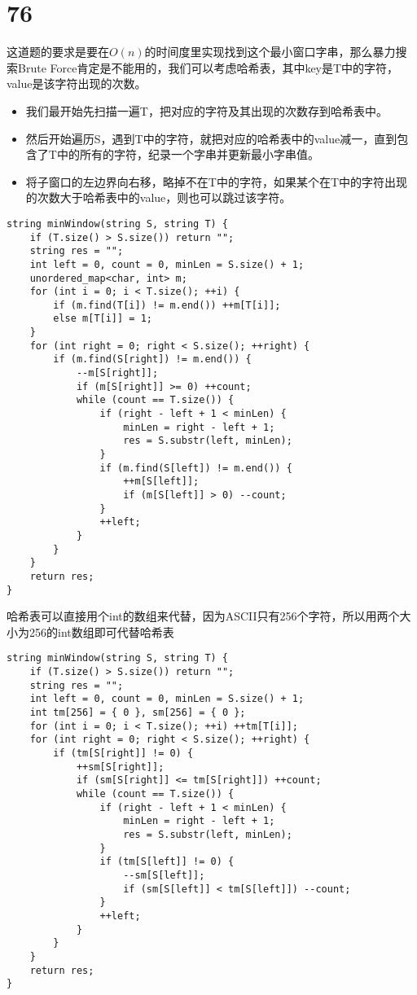 \documentclass[12pt,a4paper]{article}
\begin{document}
\section{76}
\begin{CJK}{UTF8}{gbsn}
这道题的要求是要在$O(n)$的时间度里实现找到这个最小窗口字串，那么暴力搜索Brute Force肯定是不能用的，我们可以考虑哈希表，其中key是T中的字符，value是该字符出现的次数。
\begin{itemize}
\item 我们最开始先扫描一遍T，把对应的字符及其出现的次数存到哈希表中。
\item 然后开始遍历S，遇到T中的字符，就把对应的哈希表中的value减一，直到包含了T中的所有的字符，纪录一个字串并更新最小字串值。
\item 将子窗口的左边界向右移，略掉不在T中的字符，如果某个在T中的字符出现的次数大于哈希表中的value，则也可以跳过该字符。
\end{itemize}
\end{CJK}
\begin{lstlisting}
string minWindow(string S, string T) {
	if (T.size() > S.size()) return "";
	string res = "";
	int left = 0, count = 0, minLen = S.size() + 1;
	unordered_map<char, int> m;
	for (int i = 0; i < T.size(); ++i) {
		if (m.find(T[i]) != m.end()) ++m[T[i]];
		else m[T[i]] = 1;
	}
	for (int right = 0; right < S.size(); ++right) {
		if (m.find(S[right]) != m.end()) {
			--m[S[right]];
			if (m[S[right]] >= 0) ++count;
			while (count == T.size()) {
				if (right - left + 1 < minLen) {
					minLen = right - left + 1;
					res = S.substr(left, minLen);
				}
				if (m.find(S[left]) != m.end()) {
					++m[S[left]];
					if (m[S[left]] > 0) --count;
				}
				++left;
			}
		}
	}
	return res;
}
\end{lstlisting}
\begin{CJK}{UTF8}{gbsn}
哈希表可以直接用个int的数组来代替，因为ASCII只有256个字符，所以用两个大小为256的int数组即可代替哈希表
\end{CJK}
\begin{lstlisting}
string minWindow(string S, string T) {
	if (T.size() > S.size()) return "";
	string res = "";
	int left = 0, count = 0, minLen = S.size() + 1;
	int tm[256] = { 0 }, sm[256] = { 0 };
	for (int i = 0; i < T.size(); ++i) ++tm[T[i]];
	for (int right = 0; right < S.size(); ++right) {
		if (tm[S[right]] != 0) {
			++sm[S[right]];
			if (sm[S[right]] <= tm[S[right]]) ++count;
			while (count == T.size()) {
				if (right - left + 1 < minLen) {
					minLen = right - left + 1;
					res = S.substr(left, minLen);
				}
				if (tm[S[left]] != 0) {
					--sm[S[left]];
					if (sm[S[left]] < tm[S[left]]) --count;
				}
				++left;
			}
		}
	}
	return res;
}
\end{lstlisting}
\end{document}
